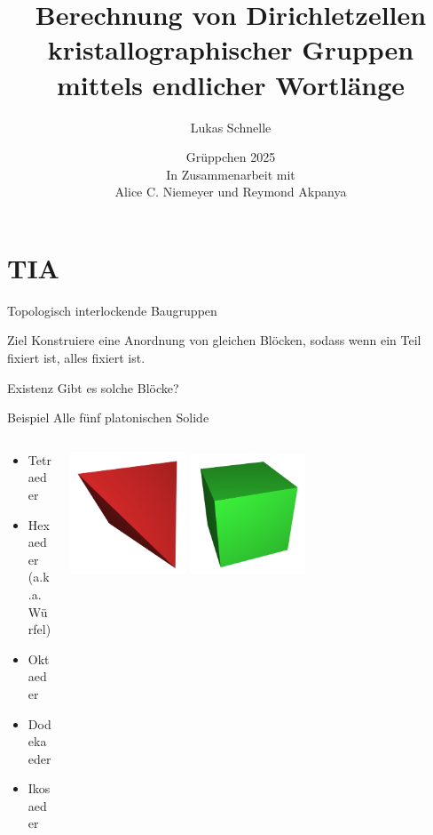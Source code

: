 \documentclass{beamer}
\title{Berechnung von Dirichletzellen kristallographischer Gruppen mittels endlicher Wortlänge }
\author{Lukas Schnelle}
\date{Grüppchen 2025 \\ In Zusammenarbeit mit \\Alice C. Niemeyer und Reymond Akpanya}
\theoremstyle{plain}
\begin{document}
\frame[plain]{\titlepage}

\section{TIA}
\begin{frame}{Topologisch interlockende Baugruppen}
    \begin{exampleblock}{Ziel}
        Konstruiere eine Anordnung von gleichen Blöcken, sodass wenn ein Teil fixiert ist, alles fixiert ist.
    \end{exampleblock}
    \pause
    \begin{block}{Existenz}
        Gibt es solche Blöcke?
    \end{block}
\end{frame}

\begin{frame}
    \begin{exampleblock}{Beispiel}
        Alle fünf platonischen Solide
        \begin{columns}
            \begin{column}{0.5\textwidth}
                \begin{itemize}[label=\textbullet]
                    \item Tetraeder 
                    \item Hexaeder (a.k.a. Würfel) 
                    \item Oktaeder 
                    \item Dodekaeder 
                    \item Ikosaeder 
                \end{itemize}
            \end{column}
            \begin{column}{0.5\textwidth}
                \centering
                \includegraphics[width=0.3\textwidth]{images/tet.png}
                \includegraphics[width=0.3\textwidth]{images/cube.png}

\end{column}
\end{columns}
\end{exampleblock}
\end{frame}
\end{document}
